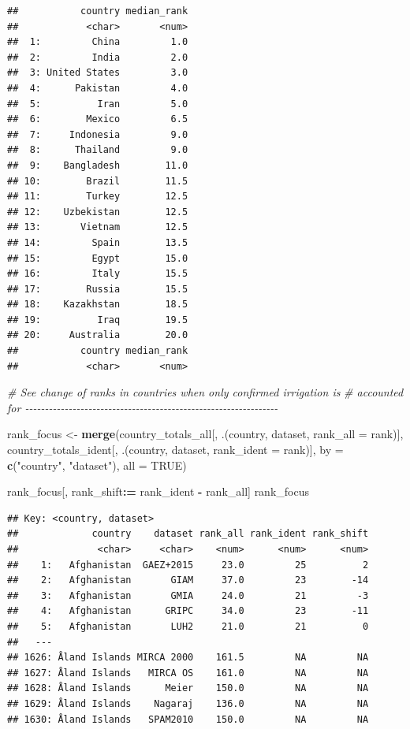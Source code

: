 \documentclass[
  11pt,
]{article}
\newenvironment{Shaded}{\begin{snugshade}}{\end{snugshade}}
\newcommand{\AttributeTok}[1]{\textcolor[rgb]{0.13,0.29,0.53}{#1}}
\newcommand{\CommentTok}[1]{\textcolor[rgb]{0.56,0.35,0.01}{\textit{#1}}}
\newcommand{\ConstantTok}[1]{\textcolor[rgb]{0.56,0.35,0.01}{#1}}
\newcommand{\FunctionTok}[1]{\textcolor[rgb]{0.13,0.29,0.53}{\textbf{#1}}}
\newcommand{\NormalTok}[1]{#1}
\newcommand{\OtherTok}[1]{\textcolor[rgb]{0.56,0.35,0.01}{#1}}
\newcommand{\SpecialCharTok}[1]{\textcolor[rgb]{0.81,0.36,0.00}{\textbf{#1}}}
\newcommand{\StringTok}[1]{\textcolor[rgb]{0.31,0.60,0.02}{#1}}
\begin{document}
\begin{verbatim}
##           country median_rank
##            <char>       <num>
##  1:         China         1.0
##  2:         India         2.0
##  3: United States         3.0
##  4:      Pakistan         4.0
##  5:          Iran         5.0
##  6:        Mexico         6.5
##  7:     Indonesia         9.0
##  8:      Thailand         9.0
##  9:    Bangladesh        11.0
## 10:        Brazil        11.5
## 11:        Turkey        12.5
## 12:    Uzbekistan        12.5
## 13:       Vietnam        12.5
## 14:         Spain        13.5
## 15:         Egypt        15.0
## 16:         Italy        15.5
## 17:        Russia        15.5
## 18:    Kazakhstan        18.5
## 19:          Iraq        19.5
## 20:     Australia        20.0
##           country median_rank
##            <char>       <num>
\end{verbatim}

\begin{Shaded}
\begin{Highlighting}[]
\CommentTok{\# See change of ranks in countries when only confirmed irrigation is }
\CommentTok{\# accounted for {-}{-}{-}{-}{-}{-}{-}{-}{-}{-}{-}{-}{-}{-}{-}{-}{-}{-}{-}{-}{-}{-}{-}{-}{-}{-}{-}{-}{-}{-}{-}{-}{-}{-}{-}{-}{-}{-}{-}{-}{-}{-}{-}{-}{-}{-}{-}{-}{-}{-}{-}{-}{-}{-}{-}{-}{-}{-}{-}{-}{-}{-}{-}{-}}

\NormalTok{rank\_focus }\OtherTok{\textless{}{-}} \FunctionTok{merge}\NormalTok{(country\_totals\_all[, .(country, dataset, }\AttributeTok{rank\_all =}\NormalTok{ rank)],}
\NormalTok{                    country\_totals\_ident[, .(country, dataset, }\AttributeTok{rank\_ident =}\NormalTok{ rank)],}
                    \AttributeTok{by =} \FunctionTok{c}\NormalTok{(}\StringTok{"country"}\NormalTok{, }\StringTok{"dataset"}\NormalTok{), }\AttributeTok{all =} \ConstantTok{TRUE}\NormalTok{)}

\NormalTok{rank\_focus[, rank\_shift}\SpecialCharTok{:=}\NormalTok{ rank\_ident }\SpecialCharTok{{-}}\NormalTok{ rank\_all]}
\NormalTok{rank\_focus}
\end{Highlighting}
\end{Shaded}

\begin{verbatim}
## Key: <country, dataset>
##             country    dataset rank_all rank_ident rank_shift
##              <char>     <char>    <num>      <num>      <num>
##    1:   Afghanistan  GAEZ+2015     23.0         25          2
##    2:   Afghanistan       GIAM     37.0         23        -14
##    3:   Afghanistan       GMIA     24.0         21         -3
##    4:   Afghanistan      GRIPC     34.0         23        -11
##    5:   Afghanistan       LUH2     21.0         21          0
##   ---                                                        
## 1626: Åland Islands MIRCA 2000    161.5         NA         NA
## 1627: Åland Islands   MIRCA OS    161.0         NA         NA
## 1628: Åland Islands      Meier    150.0         NA         NA
## 1629: Åland Islands    Nagaraj    136.0         NA         NA
## 1630: Åland Islands   SPAM2010    150.0         NA         NA
\end{verbatim}
\end{document}
